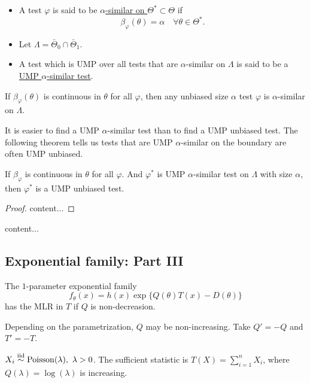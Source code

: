 \begin{mydef}\textbf{ }
	\begin{itemize}
		\item A test $\varphi$ is said to be \uline{$\alpha$-similar on $\Theta^\ast \subset \Theta$} if 
		$$\beta_\varphi(\theta) = \alpha \quad \forall \theta \in \Theta^\ast.$$
		
		\item Let $\Lambda = \bar{\Theta}_0 \cap \bar{\Theta}_1$.
		
		\item A test which is UMP over all tests that are $\alpha$-similar on $\Lambda$ is said to be a \uline{UMP $\alpha$-similar test}.
	\end{itemize}
\end{mydef}
\begin{remark}
	If $\beta_\varphi(\theta)$ is continuous in $\theta$ for all $\varphi$, then any unbiased size $\alpha$ test $\varphi$ is $\alpha$-similar on $\Lambda$.
\end{remark}

It is easier to find a UMP $\alpha$-similar test than to find a UMP unbiased test. The following theorem tells us tests that are UMP $\alpha$-similar on the boundary are often UMP unbiased.
\begin{thm}
	If $\beta_\varphi$ is continuous in $\theta$ for all $\varphi$. And $\varphi^\ast$ is UMP $\alpha$-similar test on $\Lambda$ with size $\alpha$, then $\varphi^\ast$ is a UMP unbiased test.
\end{thm}
\begin{proof}
	content...
\end{proof}

\begin{exap}
	content...
\end{exap}

\subsection{Exponential family: Part III}
\begin{thm}
	The $1$-parameter exponential family
	$$f_\theta(x) = h(x) \exp\{ Q(\theta) T(x) - D(\theta) \} $$
	has the MLR in $T$ if $Q$ is non-decreasion.
\end{thm}
\begin{remark}
	Depending on the parametrization, $Q$ may be non-increasing. Take $Q'= -Q$ and $T' = - T$.
\end{remark}
\begin{exap}
	$X_i \SimIID \mathrm{Poisson}(\lambda), \ \lambda>0$. The sufficient statistic is $T(X) = \sum_{i=1}^n X_i$, where $Q(\lambda) = \log(\lambda)$ is increasing.
\end{exap}

